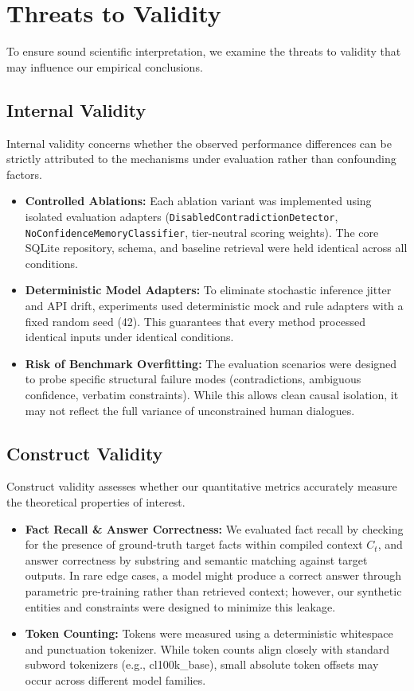 \section{Threats to Validity}
\label{sec:threats_validity}

To ensure sound scientific interpretation, we examine the threats to validity that may influence our empirical conclusions.

\subsection{Internal Validity}
Internal validity concerns whether the observed performance differences can be strictly attributed to the mechanisms under evaluation rather than confounding factors.
\begin{itemize}
    \item \textbf{Controlled Ablations:} Each ablation variant was implemented using isolated evaluation adapters (\texttt{DisabledContradictionDetector}, \texttt{NoConfidenceMemoryClassifier}, tier-neutral scoring weights). The core SQLite repository, schema, and baseline retrieval were held identical across all conditions.
    \item \textbf{Deterministic Model Adapters:} To eliminate stochastic inference jitter and API drift, experiments used deterministic mock and rule adapters with a fixed random seed (42). This guarantees that every method processed identical inputs under identical conditions.
    \item \textbf{Risk of Benchmark Overfitting:} The evaluation scenarios were designed to probe specific structural failure modes (contradictions, ambiguous confidence, verbatim constraints). While this allows clean causal isolation, it may not reflect the full variance of unconstrained human dialogues.
\end{itemize}

\subsection{Construct Validity}
Construct validity assesses whether our quantitative metrics accurately measure the theoretical properties of interest.
\begin{itemize}
    \item \textbf{Fact Recall & Answer Correctness:} We evaluated fact recall by checking for the presence of ground-truth target facts within compiled context $C_t$, and answer correctness by substring and semantic matching against target outputs. In rare edge cases, a model might produce a correct answer through parametric pre-training rather than retrieved context; however, our synthetic entities and constraints were designed to minimize this leakage.
    \item \textbf{Token Counting:} Tokens were measured using a deterministic whitespace and punctuation tokenizer. While token counts align closely with standard subword tokenizers (e.g., cl100k\_base), small absolute token offsets may occur across different model families.
\end{itemize}

